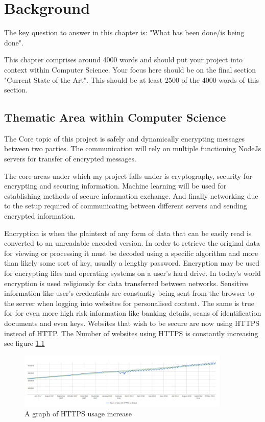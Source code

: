 \chapter{Background}
\label{chap:background}
%
%
%
%
The key question to answer in this chapter is: "What has been done/is being done". 

This chapter comprises around 4000 words and should put your project into context within Computer Science. Your focus here should be on the final section "Current State of the Art". This should be at least 2500 of the 4000 words of this section.
%
%
%
%
\section{Thematic Area within Computer Science}
The Core topic of this project is safely and dynamically encrypting messages between two parties. The communication will rely on multiple functioning NodeJs servers for transfer of encrypted messages. 

The core areas under which my project falls under is cryptography, security for encrypting and securing information. Machine learning will be used for establishing methods of secure information exchange. And finally networking due to the setup required of communicating between different servers and sending encrypted information.


Encryption \cite{encryptionDefinition} is when the plaintext of any form of data that can be easily read is converted to an unreadable encoded version. In order to retrieve the original data for viewing or processing it must be decoded using a specific algorithm and more than likely some sort of key, usually a lengthy password. Encryption may be used for encrypting files and operating systems on a user's hard drive. In today's world encryption is used religiously for data transferred between networks. Sensitive information like user's credentials are constantly being sent from the browser to the server when logging into websites for personalised content. The same is true for for even more high risk information like banking details, scans of identification documents and even keys. Websites that wish to be secure are now using HTTPS instead of HTTP. The Number of websites using HTTPS is constantly increasing see figure \ref{fig:httpsRise}

\begin{figure}[ht]
  \centering
      \includegraphics[width=0.9\textwidth]{Figures/httpsRise.png}
  \caption[A graph of HTTPS usage increase]{A graph of HTTPS usage increase\cite{https}}
  \label{fig:httpsRise}
\end{figure}

